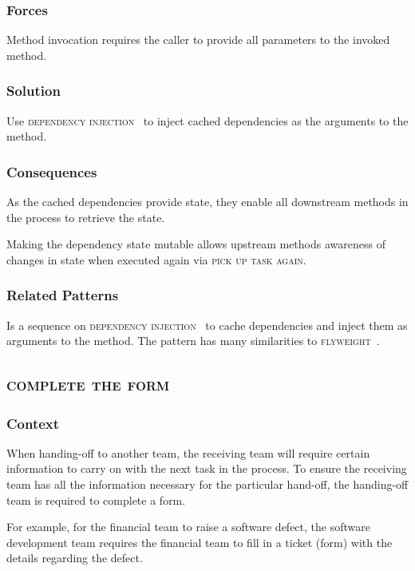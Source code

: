 \documentclass[prodmode]{style/acmlarge}
\begin{document}
\subsubsection*{Forces} Method invocation requires the caller to provide all
parameters to the invoked method.

\subsubsection*{Solution} Use \textsc{dependency injection}~\cite{ioc} to inject
cached dependencies as the arguments to the method.

\subsubsection*{Consequences} As the cached dependencies provide state, they
enable all downstream methods in the process to retrieve the state.

Making the dependency state mutable allows upstream methods awareness of changes
in state when executed again via \textsc{pick up task again}.

\subsubsection*{Related Patterns} Is a sequence on \textsc{dependency
injection}~\cite{ioc} to cache dependencies and inject them as arguments to the
method.  The pattern has many similarities to \textsc{flyweight}~\cite{gof}.



\subsection{\textsc{\textbf{complete the form}}}

\subsubsection*{Context} When handing-off to another team, the receiving team
will require certain information to carry on with the next task in the process.  To
ensure the receiving team has all the information necessary for the particular
hand-off, the handing-off team is required to complete a form.

For example, for the financial team to raise a software defect, the software
development team requires the financial team to fill in a ticket (form) with the
details regarding the defect.
\end{document}
